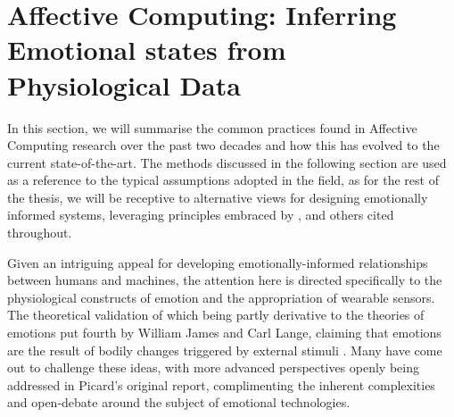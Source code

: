 



\section{Affective Computing: Inferring Emotional states from Physiological Data}
\label{affective_computng_lit_review}

In this section, we will summarise the common practices found in Affective Computing research over the past two decades and how this has evolved to the current state-of-the-art. The methods discussed in the following section are used as a reference to the typical assumptions adopted in the field, as for the rest of the thesis, we will be receptive to alternative views for designing emotionally informed systems, leveraging principles embraced by \citeauthor{hook_interactional_2008} \cite{hook_interactional_2008}, \citeauthor{barrett_functionalism_2017} \cite{barrett_functionalism_2017} and others cited throughout.

Given an intriguing appeal for developing emotionally-informed relationships between humans and machines, the attention here is directed specifically to the physiological constructs of emotion and the appropriation of wearable sensors. The theoretical validation of which being partly derivative to the theories of emotions put fourth by William James and Carl Lange, claiming that emotions are the result of bodily changes triggered by external stimuli \cite{james_principles_1890,cannon_james-lange_1927}. Many have come out to challenge these ideas, with more advanced perspectives openly being addressed in Picard's original report, complimenting the inherent complexities and open-debate around the subject of emotional technologies.

